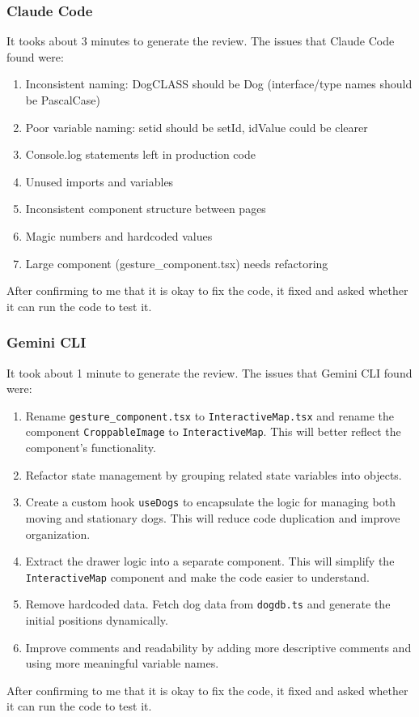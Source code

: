 \documentclass[9.5pt]{article}
\begin{document}
\subsubsection{Claude Code}
It tooks about 3 minutes to generate the review.
The issues that Claude Code found were:
\begin{enumerate}
    \item Inconsistent naming: DogCLASS should be Dog (interface/type names should be PascalCase)
    \item Poor variable naming: setid should be setId, idValue could be clearer
    \item Console.log statements left in production code
    \item Unused imports and variables
    \item Inconsistent component structure between pages
    \item Magic numbers and hardcoded values
    \item Large component (gesture\_component.tsx) needs refactoring
\end{enumerate}
After confirming to me that it is okay to fix the code, it fixed and asked whether it can run the code to test it.

\subsubsection{Gemini CLI}
It took about 1 minute to generate the review.
The issues that Gemini CLI found were:
\begin{enumerate}
    \item Rename \texttt{gesture\_component.tsx} to \texttt{InteractiveMap.tsx} and rename the component \texttt{CroppableImage} to \texttt{InteractiveMap}. This will better reflect the component's functionality.
    \item Refactor state management by grouping related state variables into objects.
    \item Create a custom hook \texttt{useDogs} to encapsulate the logic for managing both moving and stationary dogs. This will reduce code duplication and improve organization.
    \item Extract the drawer logic into a separate component. This will simplify the \texttt{InteractiveMap} component and make the code easier to understand.
    \item Remove hardcoded data. Fetch dog data from \texttt{dogdb.ts} and generate the initial positions dynamically.
    \item Improve comments and readability by adding more descriptive comments and using more meaningful variable names.
\end{enumerate}
After confirming to me that it is okay to fix the code, it fixed and asked whether it can run the code to test it.
\end{document}

